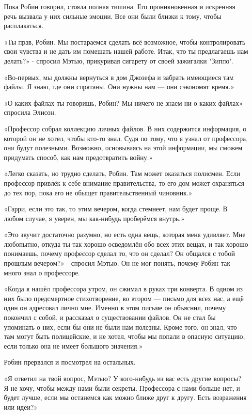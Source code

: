 \documentclass[a4paper,12pt]{book}
\begin{document}
\par
Пока Робин говорил, стояла полная тишина. Его проникновенная и искренняя речь вызвала у них сильные эмоции. Все они были близки к тому, чтобы расплакаться.
\par
«Ты прав, Робин. Мы постараемся сделать всё возможное, чтобы контролировать свои чувства и не дать им помешать нашей работе. Итак, что ты предлагаешь нам делать?» - спросил Мэтью, прикуривая сигарету от своей зажигалки "Зиппо".
\par
«Во-первых, мы должны вернуться в дом Джозефа и забрать имеющиеся там файлы. Я знаю, где они спрятаны. Они нужны нам — они сэкономят время.»
\par
«О каких файлах ты говоришь, Робин? Мы ничего не знаем ни о каких файлах» - спросила Элисон.
\par
«Профессор собрал коллекцию личных файлов. В них содержится информация, о которой он не хотел, чтобы кто-то знал. Судя по тому, что я узнал от профессора, они будут полезными. Возможно, основываясь на этой информации, мы сможем придумать способ, как нам предотвратить войну.»
\par
«Легко сказать, но трудно сделать, Робин. Там может оказаться полисмен. Если профессор привлёк к себе внимание правительства, то его дом может охраняться до тех пор, пока его не обыщет правительственный чиновник.»
\par
«Гарри, если это так, то этим вечером, когда стемнеет, нам будет проще. В любом случае, я уверен, мы как-нибудь проберёмся внутрь.»
\par
«Это звучит достаточно разумно, но есть одна вещь, которая меня удивляет. Мне любопытно, откуда ты так хорошо осведомлён обо всех этих вещах, и так хорошо понимаешь, почему профессор сделал то, что он сделал? Он общался с тобой прошлым вечером?» - спросил Мэтью. Он не мог понять, почему Робин так много знал о профессоре.
\par
«Когда я нашёл профессора утром, он сжимал в руках три конверта. В одном из них было предсмертное стихотворение, во втором — письмо для всех нас, а ещё один он адресовал лично мне. Именно в этом письме он объяснил, почему покончил с собой, и рассказал о существовании файлов. Он не стал бы упоминать о них, если бы они не были нам полезны. Кроме того, он знал, что там могут быть полицейские, и не хотел, чтобы мы попали в опасную ситуацию, если только она не имеет большого значения.»
\par
Робин прервался и посмотрел на остальных.
\par
«Я ответил на твой вопрос, Мэтью? У кого-нибудь из вас есть другие вопросы? Я не хочу, чтобы между нами были секреты. Профессора с нами больше нет, и будет лучше, если мы останемся как можно ближе друг к другу. Есть возражения или идеи?»
\end{document}
